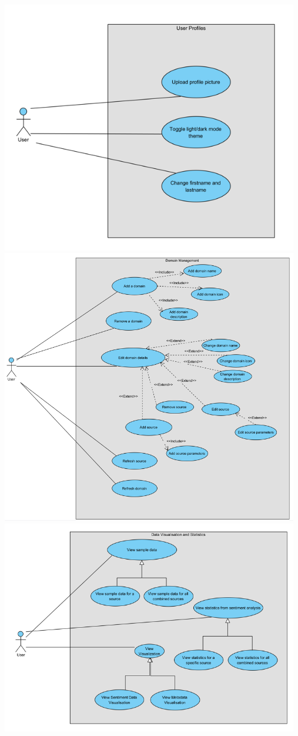 \documentclass[12pt]{article}
\begin{document}
\begin{center}
  \includegraphics[width=13cm]{../../Images/uc1.3.png}
  \includegraphics[width=13cm]{../../Images/uc1.4.png}
  \includegraphics[width=13cm]{../../Images/uc1.5.png}
\end{center}
\end{document}
